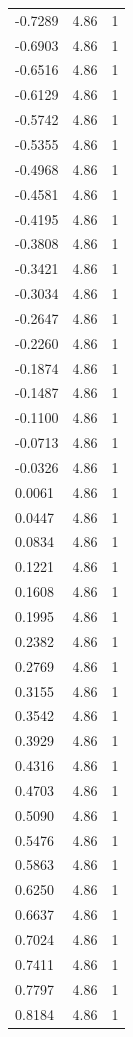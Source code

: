 \begin{longtable}{lrr}
  -0.7289 & 4.86 & 1 \\
  -0.6903 & 4.86 & 1 \\
  -0.6516 & 4.86 & 1 \\
  -0.6129 & 4.86 & 1 \\
  -0.5742 & 4.86 & 1 \\
  -0.5355 & 4.86 & 1 \\
  -0.4968 & 4.86 & 1 \\
  -0.4581 & 4.86 & 1 \\
  -0.4195 & 4.86 & 1 \\
  -0.3808 & 4.86 & 1 \\
  -0.3421 & 4.86 & 1 \\
  -0.3034 & 4.86 & 1 \\
  -0.2647 & 4.86 & 1 \\
  -0.2260 & 4.86 & 1 \\
  -0.1874 & 4.86 & 1 \\
  -0.1487 & 4.86 & 1 \\
  -0.1100 & 4.86 & 1 \\
  -0.0713 & 4.86 & 1 \\
  -0.0326 & 4.86 & 1 \\
  0.0061 & 4.86 & 1 \\
  0.0447 & 4.86 & 1 \\
  0.0834 & 4.86 & 1 \\
  0.1221 & 4.86 & 1 \\
  0.1608 & 4.86 & 1 \\
  0.1995 & 4.86 & 1 \\
  0.2382 & 4.86 & 1 \\
  0.2769 & 4.86 & 1 \\
  0.3155 & 4.86 & 1 \\
  0.3542 & 4.86 & 1 \\
  0.3929 & 4.86 & 1 \\
  0.4316 & 4.86 & 1 \\
  0.4703 & 4.86 & 1 \\
  0.5090 & 4.86 & 1 \\
  0.5476 & 4.86 & 1 \\
  0.5863 & 4.86 & 1 \\
  0.6250 & 4.86 & 1 \\
  0.6637 & 4.86 & 1 \\
  0.7024 & 4.86 & 1 \\
  0.7411 & 4.86 & 1 \\
  0.7797 & 4.86 & 1 \\
  0.8184 & 4.86 & 1 \\

\end{longtable}
